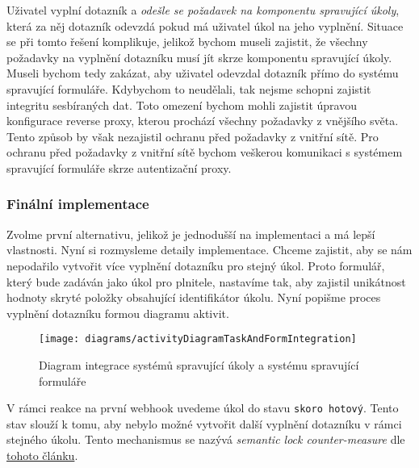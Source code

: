Uživatel vyplní dotazník a \emph{odešle se požadavek na komponentu spravující úkoly}, která za něj dotazník odevzdá pokud má uživatel úkol na jeho vyplnění.
Situace se při tomto řešení komplikuje, jelikož bychom museli zajistit, že všechny požadavky na vyplnění dotazníku musí jít skrze komponentu spravující úkoly.
Museli bychom tedy zakázat, aby uživatel odevzdal dotazník přímo do systému spravující formuláře.
Kdybychom to neudělali, tak nejsme schopni zajistit integritu sesbíraných dat.
Toto omezení bychom mohli zajistit úpravou konfigurace reverse proxy, kterou prochází všechny požadavky z vnějšího světa.
Tento způsob by však nezajistil ochranu před požadavky z vnitřní sítě.
Pro ochranu před požadavky z vnitřní sítě bychom veškerou komunikaci s systémem spravující formuláře skrze autentizační proxy.

\subsubsection{Finální implementace}\label{subsubsec:finalni-implementace}

Zvolme první alternativu, jelikož je jednodušší na implementaci a má lepší vlastnosti.
Nyní si rozmysleme detaily implementace.
Chceme zajistit, aby se nám nepodařilo vytvořit více vyplnění dotazníku pro stejný úkol.
Proto formulář, který bude zadáván jako úkol pro plnitele, nastavíme tak, aby zajistil unikátnost hodnoty skryté položky obsahující identifikátor úkolu.
Nyní popišme proces vyplnění dotazníku formou diagramu aktivit.

\begin{figure}[H]
    \centering
    \texttt{[image: diagrams/activityDiagramTaskAndFormIntegration]}
    \caption{Diagram integrace systémů spravující úkoly a systému spravující formuláře}\label{fig:activity-diagram-task-and-form-integration}
\end{figure}

V rámci reakce na první webhook uvedeme úkol do stavu \texttt{skoro hotový}.
Tento stav slouží k tomu, aby nebylo možné vytvořit další vyplnění dotazníku v rámci stejného úkolu.
Tento mechanismus se nazývá \emph{semantic lock counter-measure} dle \href{https://microservices.io/post/microservices/2019/07/09/developing-sagas-part-1.html}{tohoto článku}.

